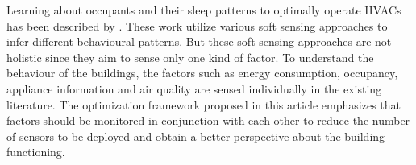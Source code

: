 \documentclass[]{interact}
\theoremstyle{plain}%
\theoremstyle{definition}
\theoremstyle{remark}
\begin{document}
Learning about occupants and their sleep patterns to optimally operate HVACs has been described by \cite{lu}. 
These work utilize various soft sensing approaches to infer different behavioural patterns.
But these soft sensing approaches are not holistic since they aim to sense only one kind of factor.  
To understand the behaviour of the buildings, the factors such as energy  consumption, occupancy, appliance information and air quality are sensed individually in the existing literature.
The optimization framework proposed in this article emphasizes that factors should be monitored in conjunction with each other to reduce the number of sensors to be deployed and obtain a better perspective about the building functioning.
\end{document}
